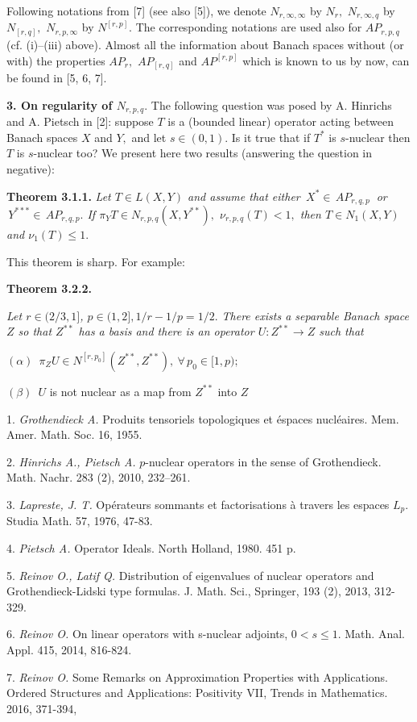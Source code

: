 Following notations from [7] (see also [5]), we denote
$N_{r,\infty,\infty}$ by $N_r,$
$N_{r,\infty,q}$ by $N_{[r,q]},$
$N_{r,p,\infty}$ by $N^{[r,p]}.$
The corresponding notations are used also for $AP_{r,p,q}$
(cf.  (i)--(iii) above).
Almost all the information about Banach spaces without (or with) the properties
 $AP_r,$ $AP_{[r,q]}$ and  $AP^{[r,p]}$ which is known to us by now,
 can be found in [5, 6, 7].
                \medskip


{\bf 3. On regularity of $N_{r,p,q}.$}
The following question was posed by A. Hinrichs and A. Pietsch  in [2]:
suppose $T$ is a (bounded linear) operator acting between Banach spaces $X$ and $Y,$
and let $s\in(0,1).$ Is it true that if $T^*$ is $s$-nuclear then $T$ is $s$-nuclear too?
We present here two results (answering the question in negative):
\smallskip

\textbf{Theorem 3.1.1.} {\it
Let  $ T\in L(X,Y)$
and assume that either
$\, X^*\in \,AP_{r,q,p}\ $ or $\, Y^{***}\in \,AP_{r,q,p}.$
If $\pi_Y T\in N_{r,p,q}(X, Y^{**}),$
     $\nu_{r,p,q}(T)<1,$
then  $T\in N_1(X,Y)$ and
      $\nu_1(T)\leqslant1.$
 }
\smallskip

This theorem is sharp. For example:

\smallskip

  \textbf{Theorem 3.2.2.} {\it
  Let $r\in(2/3,1]$, $p\in(1,2], 1/r-1/p=1/2.$
 There exists a separable Banach space $Z$ so that
   $Z^{**}$ has a ba\-sis and
 there is an operator $U:Z^{**}\to Z$ such that

  $(\alpha)$\, $\pi_ZU\in N^{[r,p_0]}(Z^{**},Z^{**}),\ \forall \, p_0\in[1,p);$

  $(\beta)$\, $U$ is not nuclear as a map from $Z^{**}$ into $Z$
}

\litlist

1. {\it Grothendieck A.} Produits tensoriels topologiques et \'espa\-ces nucl\'eaires.
Mem. Amer. Math. Soc. 16, 1955.

2. {\it Hinrichs A.,  Pietsch A.} $p$-nuclear operators in the sense of Grothendieck.
Math. Nachr. 283 (2), 2010, 232--261.

3. {\it Lapreste, J. T.} Op\'erateurs sommants et factorisations \`a travers les espaces $L_p.$
Studia Math. 57, 1976, 47-83.

4. {\it Pietsch A.} Operator Ideals. North Holland, 1980. 451 p.

5. {\it Reinov O., Latif Q.} Distribution of eigenvalues of nuclear operators and
Grothendieck-Lidski type formulas. J. Math. Sci., Springer,
193 (2),  2013, 312-329.

6. {\it Reinov O.} On linear operators with s-nuclear adjoints, $0 < s \leqslant 1.$
Math. Anal. Appl. 415, 2014, 816-824.

7. {\it Reinov O.} Some Remarks on Approximation Properties with Applications.
Ordered Structures and Applications: Positi\-vity VII, Trends in Mathematics. 2016, 371-394,
